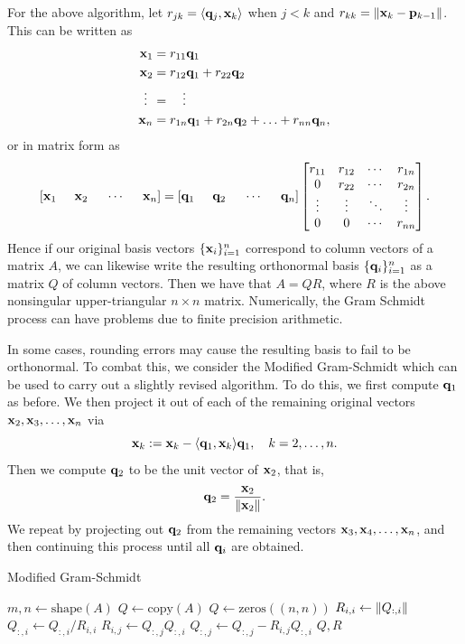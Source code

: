 For the above algorithm, let $r_{j k} = \langle {\bf q}_j, {\bf x}_k\rangle$ when $j < k$ and
$r_{kk} = \|{\bf x}_k-{\bf p}_{k-1}\|$.
This can be written as
\begin{align*}
{\bf x}_1 &= r_{1 1} {\bf q}_1\\
{\bf x}_2 &= r_{1 2} {\bf q}_1 + r_{2 2} {\bf q}_2\\
\vdots \:\: &= \quad \vdots\\
{\bf x}_n &= r_{1 n} {\bf q}_1 + r_{2 n} {\bf q}_2 + \ldots + r_{n n} {\bf q}_{n},
\end{align*}
or in matrix form as
\[
[{\bf x}_1 \hspace{5mm} {\bf x}_2 \hspace{5mm} \cdots \hspace{5mm} {\bf x}_n]
=
[{\bf q}_1 \hspace{5mm} {\bf q}_2 \hspace{5mm} \cdots \hspace{5mm} {\bf q}_n]
\begin{bmatrix}
r_{1 1} & r_{1 2} & \cdots & r_{1 n}\\
0 & r_{2 2} & \cdots & r_{2 n}\\
\vdots & \vdots & \ddots & \vdots\\
0 & 0 & \cdots & r_{n n}
\end{bmatrix}.
\]
Hence if our original basis vectors $\{{\bf x}_i\}_{i=1}^n$ correspond to column
vectors of a matrix $A$, we can likewise write the resulting
orthonormal basis $\{{\bf q}_i\}_{i=1}^n$ as a matrix $Q$ of column
vectors.  Then we have that $A = Q R$, where $R$ is the above
nonsingular upper-triangular $n\times n$ matrix.
Numerically, the Gram Schmidt process can have problems due to
finite precision arithmetic. 

In some cases, rounding errors may cause the resulting basis to fail to be orthonormal. To combat this, we consider the Modified Gram-Schmidt which can be used to carry out a slightly revised algorithm.  To do this, we first compute ${\bf q}_1$ as before.  We then project it out of each of the remaining original vectors
${\bf x}_2,{\bf x}_3,\ldots,{\bf x}_n$ via
\[
{\bf x}_k := {\bf x}_k - \langle {\bf q}_1,{\bf x}_{k} \rangle {\bf q}_1,\quad k=2,\ldots,n.
\]
Then we compute ${\bf q}_2$ to be the unit vector of ${\bf x}_2$, that is,
\[
{\bf q}_2 = \frac{{\bf x}_2}{\|{\bf x}_2\|}.
\]
We repeat by projecting out ${\bf q}_2$ from the remaining vectors
${\bf x}_3,{\bf x}_4,\ldots,{\bf x}_n$, and then continuing this process until
all ${\bf q}_i$ are obtained.

\begin{algorithm}
\caption{Modified Gram-Schmidt}
\label{Alg:MGS}
\begin{algorithmic}[1]
\State $m, n \gets \text{shape} \left( A \right)$
\State $Q \gets \text{copy} \left( A \right)$
\State $Q \gets \text{zeros}((n,n))$
    \State $R_{i,i} \gets \left\lVert Q_{:,i}\right\rVert$
    \State $Q_{:,i} \gets Q_{:,i}/R_{i,i}$
        \State $R_{i,j} \gets Q_{:,j}Q_{:,i}$
        \State $Q_{:,j} \gets Q_{:,j}-R_{i,j}Q_{:,i}$
	\EndFor
\EndFor
\State {} $Q, R$
\EndProcedure
\end{algorithmic}
\end{algorithm}

